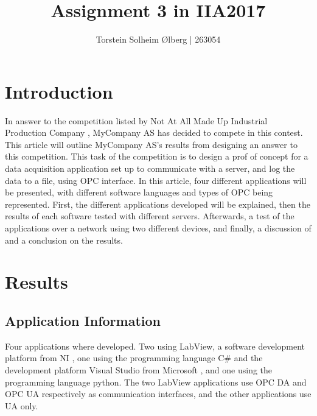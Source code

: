 \documentclass[11pt, A4paper, english]{article}
\author{Torstein Solheim Ølberg | 263054}
\title{Assignment 3 in IIA2017}
\begin{document}
\maketitle
\clearpage

\tableofcontents
\clearpage

	\section{Introduction}
In answer to the competition listed by Not At All Made Up Industrial Production Company \cite{task}, MyCompany AS has decided to compete in this contest. This article will outline MyCompany AS's results from designing an answer to this competition. This task of the competition is to design a prof of concept for a data acquisition application set up to communicate with a server, and log the data to a file, using OPC interface. In this article, four different applications will be presented, with different software languages and types of OPC being represented. First, the different applications developed will be explained, then the results of each software tested with different servers. Afterwards, a test of the applications over a network using two different devices, and finally, a discussion of and a conclusion on the results.

	\section{Results}
		\subsection{Application Information}
Four applications where developed. Two using LabView, a software development platform from NI \cite{labview}, one using the programming language C\# and the development platform Visual Studio from Microsoft \cite{VS}, and one using the programming language python. The two LabView applications use OPC DA and OPC UA respectively as communication interfaces, and the other applications use UA only.
\end{document}

